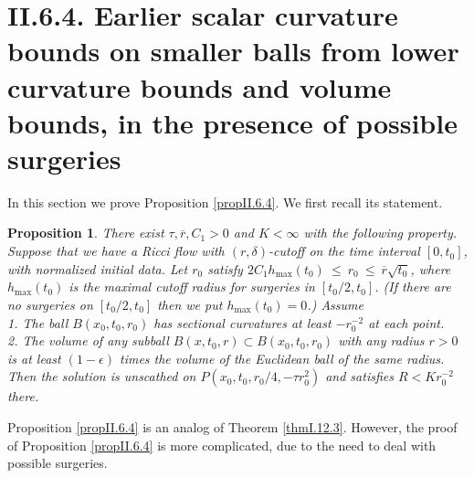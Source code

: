 \documentclass[12pt]{amsart}
\numberwithin{equation}{section}
\theoremstyle{plain}
\newtheorem{proposition}[equation]{Proposition}
\theoremstyle{definition}
\theoremstyle{remark}
\begin{document}
\section{II.6.4. Earlier scalar curvature bounds on smaller balls from
lower curvature bounds and volume bounds, in the presence of possible 
surgeries}

In this section we prove Proposition \ref{propII.6.4}.
We first recall its statement.
\begin{proposition}
There exist $\tau, \overline{r}, C_1 > 0$ and $K < \infty$ 
with the
following property. Suppose that we have a Ricci flow with $(r, \delta)$-cutoff
on the time interval $[0, t_0]$, with normalized initial data.  Let 
$r_0$ satisfy
$2C_1 h_{\max}(t_0) \: \le \: r_0 \: \le \: \overline{r} \sqrt{t_0}$,
where $h_{\max}(t_0)$ is the maximal cutoff radius for surgeries in 
$[t_0/2, t_0]$. (If there are no surgeries on $[t_0/2, t_0]$ then we put
$h_{\max}(t_0) = 0$.)
Assume \\
1. The ball $B(x_0, t_0, r_0)$ has sectional curvatures at least $- r_0^{-2}$
at each point. \\
2. The volume of any subball $B(x, t_0, r) \subset B(x_0, t_0, r_0)$ with
any radius $r > 0$ is at least $(1-\epsilon)$ times the volume of the
Euclidean ball of the same radius.\\

Then the solution is unscathed on
$P(x_0, t_0, r_0/4, - \tau r_0^2)$ and satisfies $R < K r_0^{-2}$
there.
\end{proposition}

Proposition \ref{propII.6.4}
is an analog of Theorem \ref{thmI.12.3}.  However, the proof of Proposition
\ref{propII.6.4} is more complicated, due to the need to deal with possible
surgeries.
\end{document}
